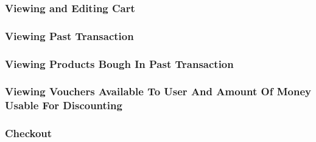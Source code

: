 \documentclass[12pt]{article}
\begin{document}
\subsubsection{Viewing and Editing Cart}

\subsubsection{Viewing Past Transaction}

\subsubsection{Viewing Products Bough In Past Transaction}

\subsubsection{Viewing Vouchers Available To User And Amount Of Money Usable For Discounting}

\subsubsection{Checkout}
\end{document}
